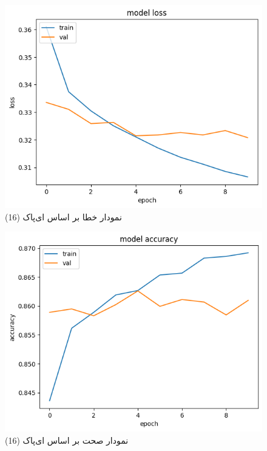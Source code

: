 \documentclass{article}
\begin{document}
\begin{figure}[!h]
    \centering\includegraphics[scale=.55]{./p5-7}
    \caption{نمودار خطا بر اساس ای‌پاک (16)}\label{fig.57}
\end{figure}


\begin{figure}[!h]
    \centering\includegraphics[scale=.55]{./p5-8}
    \caption{نمودار صحت بر اساس ای‌پاک (16)}\label{fig.58}
\end{figure}
\end{document}
